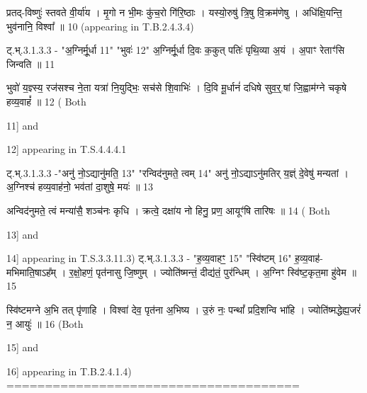 \documentclass[17pt]{extarticle}
\begin{document}
{{{{{{{{{{{{{प्रतद्-विष्णुः॑ स्तवते वी॒र्या॑य । मृ॒गो न भी॒मः कु॑च॒रो गि॑रि॒ष्ठाः । 
यस्यो॒रुषु॑ त्रि॒षु वि॒क्रम॑णेषु । अधि॑क्षि॒यन्ति॒ भुव॑नानि॒ विश्वा᳚ ॥ {10}
(appearing in T.B.2.4.3.4) 

ट्.भ्.3.1.3.3 - "अ॒ग्निर्मू॒र्धा {11}" "भुवः॑ {12}" 
अ॒ग्निर्मू॒र्धा दि॒वः क॒कुत् पतिः॑ पृथि॒व्या अ॒यं । 
अ॒पाꣳ रेताꣳ॑सि जिन्वति ॥ {11}

भुवो॑ य॒ज्ञ्स्य॒ रज॑सश्च ने॒ता यत्रा॑ नि॒युद्भिः॒ सच॑से शि॒वाभिः॑ । 
दि॒वि मू॒र्धानं॑ दधिषे सुव॒र्॒.षां जि॒ह्वाम॑ग्ने चकृषे हव्य॒वाहं᳚ ॥ {12}
( Both {11] and {12] appearing in T.S.4.4.4.1

ट्.भ्.3.1.3.3 -"अनु॑ नो॒ऽद्यानु॑मति॒ {13}" "रन्विद॑नुमते॒ त्वम् {14}" 
अनु॑ नो॒ऽद्याऽनु॑मतिर् य॒ज्ञ्ं दे॒वेषु॑ मन्यतां । 
अ॒ग्निश्च॑ हव्य॒वाह॑नो॒ भव॑तां दा॒शुषे॒ मयः॑ ॥ {13}

अन्विद॑नुमते॒ त्वं मन्या॑सै॒ शञ्च॑नः कृधि । 
क्रत्वे॒ दक्षा॑य नो हिनु॒ प्रण॒ आयूꣳ॑षि तारिषः ॥ {14}
( Both {13] and {14] appearing in T.S.3.3.11.3)
ट्.भ्.3.1.3.3 - "ह॒व्य॒वाहꣳ॒॒ {15}" "स्वि॑ष्टम् {16}" 
ह॒व्य॒वाह॑-मभिमाति॒षाऽह᳚म् । र॒क्षो॒हणं॒ पृत॑नासु जि॒ष्णुम् । 
ज्योति॑ष्मन्तं॒ दीद्य॑तं॒ पुर॑न्धिम् । अ॒ग्निꣳ स्वि॑ष्ट॒कृत॒मा हु॑वेम ॥ {15}

स्वि॑ष्टमग्ने अ॒भि तत् पृ॑णाहि । विश्वा॑ देव॒ पृत॑ना अ॒भिष्य । 
उ॒रुं नः॒ पन्थां᳚ प्रदि॒शन्वि भा॑हि । ज्योति॑ष्मद्धेह्य॒जरं॑ न॒ आयुः॑ ॥ {16}
(Both {15] and {16] appearing in T.B.2.4.1.4) 
====================================== \newline
        \pagebreak
        
        
        
}}}}}}}}}}}}}}}}}}}
\end{document}
